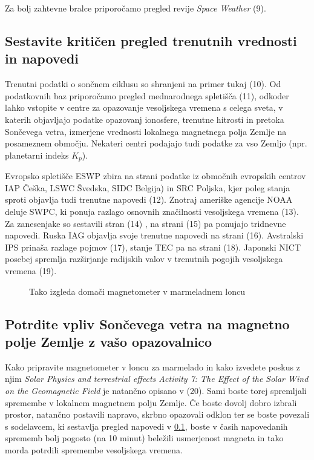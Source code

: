  
Za bolj zahtevne bralce priporočamo pregled revije \textit{Space Weather} (9).

\subsection{Sestavite kritičen pregled trenutnih vrednosti in napovedi}
\label{subsec:VesVrem_Podat}
Trenutni podatki o sončnem ciklusu so shranjeni na primer tukaj (10). Od podatkovnih baz priporočamo pregled mednarodnega spletišča (11), odkoder lahko vstopite v centre za opazovanje vesoljskega vremena s celega sveta, v katerih objavljajo podatke opazovanj ionosfere, trenutne hitrosti in pretoka Sončevega vetra, izmerjene vrednosti lokalnega magnetnega polja Zemlje na posameznem območju. Nekateri centri podajajo tudi podatke za vso Zemljo (npr. planetarni indeks $K_p$).

Evropsko spletišče ESWP zbira na strani podatke iz območnih evropskih centrov IAP Češka, LSWC Švedska, SIDC Belgija) in SRC Poljska, kjer poleg stanja sproti objavlja tudi trenutne napovedi (12). Znotraj ameriške agencije NOAA deluje SWPC, ki ponuja razlago osnovnih značilnosti vesoljskega vremena (13). Za zanesenjake so sestavili stran (14) , na strani (15) pa ponujajo tridnevne napovedi. Ruska IAG objavlja svoje trenutne napovedi na strani (16). Avstralski IPS prinaša razlage pojmov (17), stanje TEC pa na strani (18). Japonski NICT posebej spremlja razširjanje radijskih valov v trenutnih pogojih vesoljskega vremena (19).


\begin{figure}
	\centering
	\caption{Tako izgleda domači magnetometer v marmeladnem loncu}
	\label{fig:VesVr_Eksp}       %
\end{figure}
 
\subsection{Potrdite vpliv Sončevega vetra na magnetno polje Zemlje z vašo opazovalnico}
\label{subsec:VesVrem_Posk}
Kako pripravite magnetometer v loncu za marmelado in kako izvedete poskus z njim \textit{Solar Physics and terrestrial effects Activity 7: The Effect of the Solar Wind on the Geomagnetic Field} je natančno opisano v (20). Sami boste torej spremljali spremembe v lokalnem magnetnem polju Zemlje. Če boste dovolj dobro izbrali prostor, natančno postavili napravo, skrbno opazovali odklon ter se boste povezali s sodelavcem, ki sestavlja pregled napovedi v \ref{subsec:VesVrem_Podat}, boste v časih napovedanih sprememb bolj pogosto (na 10 minut) beležili usmerjenost magneta in tako morda potrdili spremembe vesoljskega vremena.


